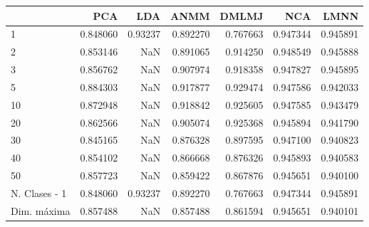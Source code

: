 \begin{tabular}{lrrrrrr}
\toprule
{} &       PCA &      LDA &      ANMM &     DMLMJ &       NCA &      LMNN \\
\midrule
1             &  0.848060 &  0.93237 &  0.892270 &  0.767663 &  0.947344 &  0.945891 \\
2             &  0.853146 &      NaN &  0.891065 &  0.914250 &  0.948549 &  0.945888 \\
3             &  0.856762 &      NaN &  0.907974 &  0.918358 &  0.947827 &  0.945895 \\
5             &  0.884303 &      NaN &  0.917877 &  0.929474 &  0.947586 &  0.942033 \\
10            &  0.872948 &      NaN &  0.918842 &  0.925605 &  0.947585 &  0.943479 \\
20            &  0.862566 &      NaN &  0.905074 &  0.925368 &  0.945894 &  0.941790 \\
30            &  0.845165 &      NaN &  0.876328 &  0.897595 &  0.947100 &  0.940823 \\
40            &  0.854102 &      NaN &  0.866668 &  0.876326 &  0.945893 &  0.940583 \\
50            &  0.857723 &      NaN &  0.859422 &  0.867876 &  0.945651 &  0.940100 \\
N. Clases - 1 &  0.848060 &  0.93237 &  0.892270 &  0.767663 &  0.947344 &  0.945891 \\
Dim. máxima   &  0.857488 &      NaN &  0.857488 &  0.861594 &  0.945651 &  0.940101 \\
\bottomrule
\end{tabular}
